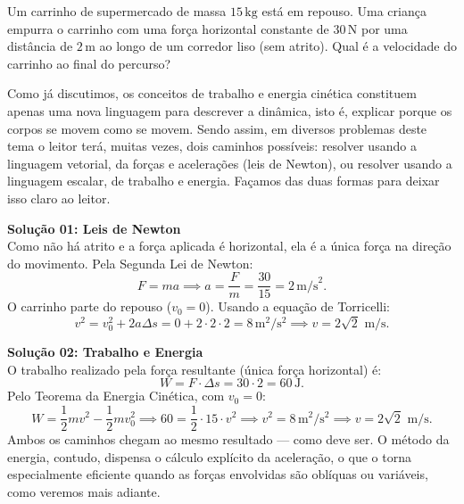 \begin{exemplo}[Nível I]\label{exemplo_energia_teoremaenergiacinetica01}

Um carrinho de supermercado de massa $15\,\text{kg}$ está em repouso.
Uma criança empurra o carrinho com uma força horizontal constante de
$30\,\text{N}$ por uma distância de $2\,\text{m}$ ao longo de um corredor
liso (sem atrito). Qual é a velocidade do carrinho ao final do percurso?

\resolucao

Como já discutimos, os conceitos de trabalho e energia cinética constituem apenas uma nova linguagem para descrever a dinâmica, isto é, explicar porque os corpos se movem como se movem. Sendo assim, em diversos problemas deste tema o leitor terá, muitas vezes, dois caminhos possíveis: resolver usando a linguagem vetorial, da forças e acelerações (leis de Newton), ou resolver usando a linguagem escalar, de trabalho e energia. Façamos das duas formas para deixar isso claro ao leitor.
\bigskip

\textbf{Solução 01: Leis de Newton} \\

Como não há atrito e a força aplicada é horizontal, ela é a única força na
direção do movimento. Pela Segunda Lei de Newton:
%
\begin{equation*}
    F = ma \implies a = \frac{F}{m} = \frac{30}{15} = 2\,\text{m/s}^2.
\end{equation*}
%
O carrinho parte do repouso ($v_0 = 0$). Usando a equação de Torricelli:
%
\begin{equation*}
    v^2 = v_0^2 + 2a\Delta s = 0 + 2 \cdot 2 \cdot 2 = 8\,\text{m}^2/\text{s}^2
    \implies \boxed{v = 2\sqrt{2} \text{ m/s}.}
\end{equation*}

\bigskip
\textbf{Solução 02: Trabalho e Energia} \\

O trabalho realizado pela força resultante (única força horizontal) é:
%
\begin{equation*}
    W = F \cdot \Delta s = 30 \cdot 2 = 60\,\text{J}.
\end{equation*}
%
Pelo Teorema da Energia Cinética, com $v_0 = 0$:
%
\begin{equation*}
    W = \frac{1}{2}mv^2 - \frac{1}{2}mv_0^2
    \implies 60 = \frac{1}{2} \cdot 15 \cdot v^2
    \implies v^2 = 8\,\text{m}^2/\text{s}^2
    \implies \boxed{v = 2\sqrt{2} \text{ m/s}.}
\end{equation*}
%
Ambos os caminhos chegam ao mesmo resultado --- como deve ser. O método
da energia, contudo, dispensa o cálculo explícito da aceleração, o que o
torna especialmente eficiente quando as forças envolvidas são oblíquas ou
variáveis, como veremos mais adiante.


\end{exemplo}


